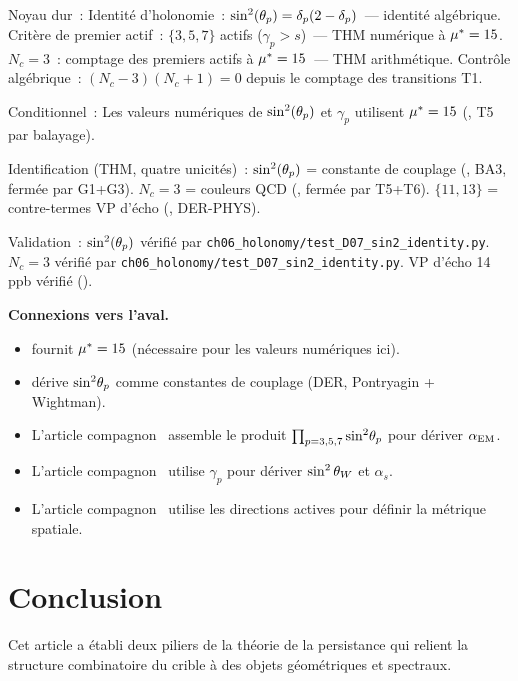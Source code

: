 \documentclass[12pt,a4paper]{article}
\begin{document}
\begin{ledgerbox}
Noyau dur~:
  Identité d'holonomie~: $\sin^2(\theta_{p}) = \delta_p(2-\delta_p)$~---
  identité algébrique.
  Critère de premier actif~: $\{3,5,7\}$ actifs ($\gamma_p > s$)~---
  THM numérique à ${\mu^{*}}=15$.
  $N_c = 3$~: comptage des premiers actifs à ${\mu^{*}} = 15$~--- THM
  arithmétique.
  Contrôle algébrique~: $(N_c-3)(N_c+1)=0$ depuis le comptage des
  transitions T1.

Conditionnel~:
  Les valeurs numériques de $\sin^2(\theta_{p})$ et $\gamma_p$ utilisent
  ${\mu^{*}} = 15$ (\cite{companion_M3}, T5 par balayage).

Identification (THM, quatre unicités)~:
  $\sin^2(\theta_{p})$ = constante de couplage (\cite{companion_M5}, BA3,
  fermée par G1+G3).
  $N_c = 3$ = couleurs QCD (\cite{companion_M5}, fermée par T5+T6).
  $\{11,13\}$ = contre-termes VP d'écho (\cite{companion_physics},
  DER-PHYS).

Validation~:
  $\sin^2(\theta_{p})$ vérifié par
  \texttt{ch06\_holonomy/test\_D07\_sin2\_identity.py}.
  $N_c = 3$ vérifié par
  \texttt{ch06\_holonomy/test\_D07\_sin2\_identity.py}.
  VP d'écho 14\,ppb vérifié (\cite{companion_physics}).
\end{ledgerbox}

\medskip\noindent\textbf{Connexions vers l'aval.}
\begin{itemize}
\item \cite{companion_M3} fournit ${\mu^{*}} = 15$ (nécessaire pour
  les valeurs numériques ici).
\item \cite{companion_M5} dérive $\sin^2\!\theta_{p}$ comme constantes de
  couplage (DER, Pontryagin + Wightman).
\item L'article compagnon~\cite{companion_physics} assemble le
  produit $\prod_{p=3,5,7} \sin^2\!\theta_{p}$ pour dériver
  $\alpha_{\rm EM}$.
\item L'article compagnon~\cite{companion_physics} utilise
  $\gamma_p$ pour dériver $\sin^2\theta_W$ et $\alpha_s$.
\item L'article compagnon~\cite{companion_physics} utilise les
  directions actives pour définir la métrique spatiale.
\end{itemize}


\newpage

\section{Conclusion}
\label{sec:conclusion}

Cet article a établi deux piliers de la théorie de la persistance qui
relient la structure combinatoire du crible à des objets géométriques
et spectraux.
\end{document}
